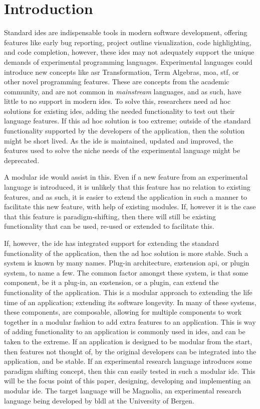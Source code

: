 \chapter{Introduction}

Standard \gls{ide}s are indispensable tools in modern software development,
offering features like early bug reporting, project outline visualization, code
highlighting, and code completion, however, these \gls{ide}s may not adequately
support the unique demands of experimental programming languages. Experimental
languages could introduce new concepts like \gls{asr} Transformation, Term
Algebras, \gls{moa}, \gls{stf}, or other novel programming features. These are
concepts from the academic community, and are not common in \textit{mainstream}
languages, and as such, have little to no support in modern \gls{ide}s. To solve
this, researchers need ad hoc solutions for existing \gls{ide}s, adding the
needed functionality to test out their language features. If this ad hoc
solution is too extreme; outside of the standard functionality supported by the
developers of the application, then the solution might be short lived. As the
\gls{ide} is maintained, updated and improved, the features used to solve the
niche needs of the experimental language might be deprecated.

A modular \gls{ide} would assist in this. Even if a new feature from an
experimental language is introduced, it is unlikely that this feature has no
relation to existing features, and as such, it is easier to extend the
application in such a manner to facilitate this new feature, with help of
existing modules.
If, however it is the case that this feature is paradigm-shifting, then there
will still be existing functionality that can be used, re-used or extended to
facilitate this.

If, however, the \gls{ide} has integrated support for extending the standard
functionality of the application, then the ad hoc solution is more stable. Such
a system is known by many names. Plug-in architecture, exstension \gls{api}, or
plugin system, to name a few. The common factor amongst these system, is that
some component, be it a plug-in, an exstension, or a plugin, can extend the
functionality of the application. This is a modular approach to extending the
life time of an application; extending its software longevity. In many of these
systems, these components, are composable, allowing for multiple components to
work together in a modular fashion to add extra features to an application. This
is way of adding functionality to an application is commonly used in \gls{ide}s,
and can be taken to the extreme. If an application is designed to be modular
from the start, then features not thought of, by the original developers can be
integrated into the application, and be stable. If an experimental research
language introduces some paradigm shifting concept, then this can easily tested
in such a modular \gls{ide}. This will be the focus point of this paper,
designing, developing and implementing an modular \gls{ide}. The target language
will be Magnolia, an experimental research language being developed by
\gls{bldl} at the University of Bergen.
